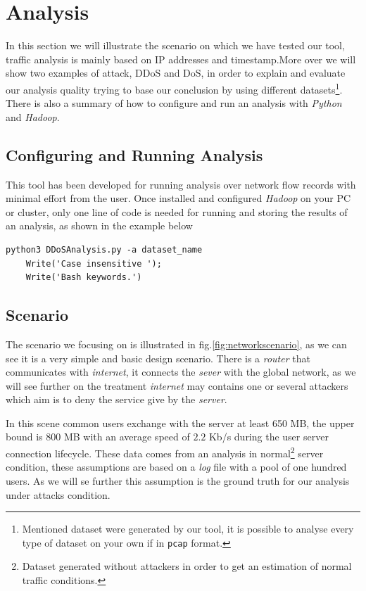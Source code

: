 \section{Analysis}
In this section we will illustrate the scenario on which we have tested our tool, traffic analysis is mainly based on IP addresses and timestamp\cite{ddos_forensics}.More over we will show two examples of attack, DDoS and DoS, in order to explain and evaluate our analysis quality trying to base our conclusion by using different datasets\footnote{Mentioned dataset were generated by our tool, it is possible to analyse every type of dataset on your own if in \texttt{pcap} format.}. There is also a summary of how to configure and run an analysis with \textit{Python} and \textit{Hadoop}.


\subsection{Configuring and Running Analysis}
This tool has been developed for running analysis over network flow records with minimal effort from the user. Once installed and configured \textit{Hadoop} on your PC or cluster, only one line of code is needed for running and storing the results of an analysis, as shown in the example below

\begin{lstlisting}[firstline=1, lastline=1]
   python3 DDoSAnalysis.py -a dataset_name
	Write('Case insensitive '); 
	Write('Bash keywords.')
\end{lstlisting}

\subsection{Scenario} 
The scenario we focusing on is illustrated in fig.\ref{fig:networkscenario}, as we can see it is a very simple and basic design scenario. There is a \textit{router} that communicates with \textit{internet},  it connects the \textit{sever} with the global network, as we will see further on the treatment \textit{internet} may contains one or several attackers which aim is to deny the service give by the \textit{server}. 

In this scene common users exchange with the server at least 650 MB, the upper bound is $800$ MB with an average speed of $2.2$ Kb/s during the user server connection lifecycle. These data comes from an analysis in normal\footnote{Dataset generated without attackers in order to get an estimation of normal traffic conditions.} server condition, these assumptions are based on a \textit{log} file with a pool of one hundred users. As we will se further this assumption is the ground truth for our analysis under attacks condition.

